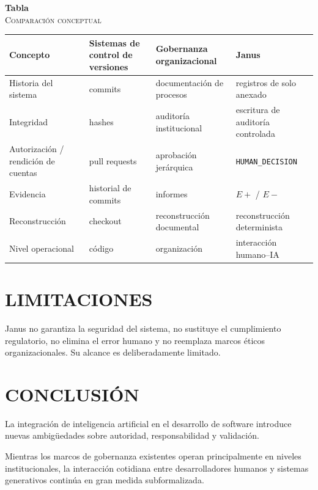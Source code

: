 \documentclass[conference]{IEEEtran}
\begin{document}
\begin{strip}
\begin{center}
\textbf{Tabla \thetable}\\
\textsc{Comparación conceptual}
\end{center}
\label{tab:comparison}
\centering\footnotesize
\setlength{\tabcolsep}{4pt}
\renewcommand{\arraystretch}{1.15}
\begin{tabularx}{\textwidth}{@{}p{} X X X@{}}
\hline
Concepto & Sistemas de control de versiones & Gobernanza organizacional & Janus \\
\hline
Historia del sistema & commits & documentación de procesos & registros de solo anexado \\
Integridad & hashes & auditoría institucional & escritura de auditoría controlada \\
Autorización / rendición de cuentas & pull requests & aprobación jerárquica & \texttt{HUMAN\_\allowbreak DECISION} \\
Evidencia & historial de commits & informes & $E+$ / $E-$ \\
Reconstrucción & checkout & reconstrucción documental & reconstrucción determinista \\
Nivel operacional & código & organización & interacción humano--IA \\
\hline
\end{tabularx}
\end{strip}

\section{LIMITACIONES}
Janus no garantiza la seguridad del sistema, no sustituye el cumplimiento regulatorio, no elimina el error humano y no reemplaza marcos éticos organizacionales. Su alcance es deliberadamente limitado.

\section{CONCLUSIÓN}
La integración de inteligencia artificial en el desarrollo de software introduce nuevas ambigüedades sobre autoridad, responsabilidad y validación.

Mientras los marcos de gobernanza existentes operan principalmente en niveles institucionales, la interacción cotidiana entre desarrolladores humanos y sistemas generativos continúa en gran medida subformalizada.
\end{document}
